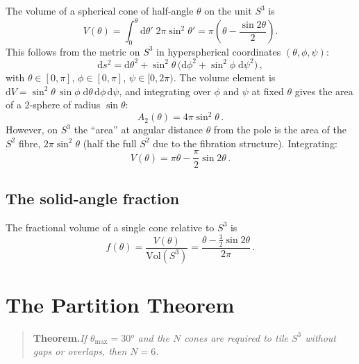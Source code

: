 \documentclass[amsmath,amssymb,aps,prd,twocolumn,superscriptaddress,nofootinbib]{revtex4-2}
\begin{document}
The volume of a spherical cone of half-angle $\theta$ on the unit $S^3$ is
\begin{equation}\label{eq:volcone}
  V(\theta) = \int_0^\theta \mathrm{d}\theta'\;
  2\pi\sin^2\theta'
  = \pi\!\left(\theta - \frac{\sin 2\theta}{2}\right).
\end{equation}
This follows from the metric on $S^3$ in hyperspherical coordinates
$(\theta,\phi,\psi)$:
\begin{equation}\label{eq:metric}
  \mathrm{d}s^2 = \mathrm{d}\theta^2 + \sin^2\!\theta\,
  \bigl(\mathrm{d}\phi^2 + \sin^2\!\phi\;\mathrm{d}\psi^2\bigr)\,,
\end{equation}
with $\theta \in [0,\pi]$, $\phi \in [0,\pi]$, $\psi \in [0,2\pi)$.  The
volume element is $\mathrm{d}V = \sin^2\!\theta\,\sin\phi\;
\mathrm{d}\theta\,\mathrm{d}\phi\,\mathrm{d}\psi$, and integrating over
$\phi$ and $\psi$ at fixed $\theta$ gives the area of a 2-sphere of radius
$\sin\theta$:
\begin{equation}
  A_2(\theta) = 4\pi\sin^2\theta\,.
\end{equation}
However, on $S^3$ the ``area'' at angular distance $\theta$ from the pole is
the area of the $S^2$ fibre, $2\pi\sin^2\theta$ (half the full $S^2$ due to
the fibration structure).  Integrating:
\begin{equation}\label{eq:volcone2}
  V(\theta) = \pi\theta - \frac{\pi}{2}\sin 2\theta\,.
\end{equation}

\subsection{The solid-angle fraction}

The fractional volume of a single cone relative to $S^3$ is
\begin{equation}\label{eq:frac}
  f(\theta) = \frac{V(\theta)}{\mathrm{Vol}(S^3)}
  = \frac{\theta - \frac{1}{2}\sin 2\theta}{2\pi}\,.
\end{equation}

\section{The Partition Theorem}\label{sec:partition}

\begin{quote}
\textbf{Theorem.}\quad\emph{If $\theta_{\max} = 30°$ and the $N$ cones are
required to tile $S^3$ without gaps or overlaps, then $N = 6$.}
\end{quote}
\end{document}
